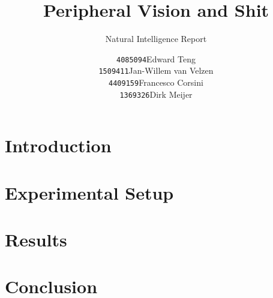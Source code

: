 \documentclass[a4,11pt]{scrartcl}
\title{Peripheral Vision and Shit}
\subtitle{Natural Intelligence Report}
\author{
\begin{tabular}{ll}
\texttt{4085094}&Edward Teng\\
\texttt{1509411}&Jan-Willem van Velzen\\
\texttt{4409159}&Francesco Corsini\\
\texttt{1369326}&Dirk Meijer
\end{tabular}}
\begin{document}
    \maketitle{}
    \tableofcontents
    \section{Introduction}
    
    \section{Experimental Setup}
    
    \section{Results}
    
    \section{Conclusion}
    
    
\end{document}
